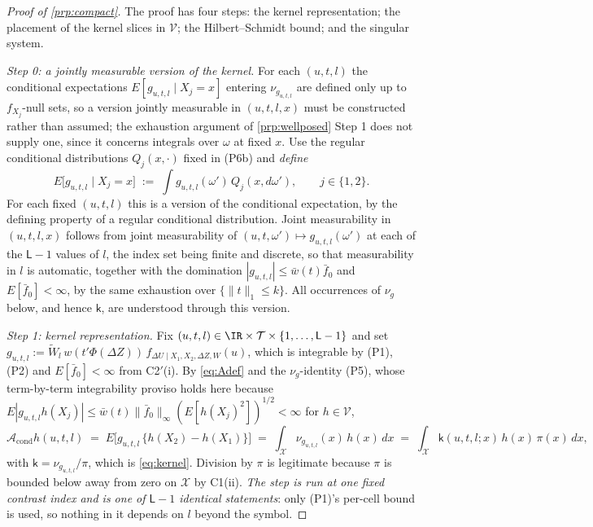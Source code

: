 \begin{proof}[Proof of \cref{prp:compact}]
The proof has four steps: the kernel representation; the placement of the kernel slices in $\mathcal V$;
the Hilbert--Schmidt bound; and the singular system.

\emph{Step 0: a jointly measurable version of the kernel.}
For each $(u,t,l)$ the conditional expectations $E[g_{u,t,l}\mid X_j=x]$ entering $\nu_{g_{u,t,l}}$ are
defined only up to $f_{X_j}$-null sets, so a version jointly measurable in $(u,t,l,x)$ must be
constructed rather
than assumed; the exhaustion argument of \cref{prp:wellposed} Step 1 does not supply one, since it
concerns integrals over $\omega$ at fixed $x$. Use the regular conditional distributions $Q_j(x,\cdot)$
fixed in (P6b) and \emph{define}
\[
E\big[g_{u,t,l}\mid X_j=x\big]\;:=\;\int g_{u,t,l}(\omega')\,Q_j(x,d\omega'),
\qquad j\in\{1,2\}.
\]
For each fixed $(u,t,l)$ this is a version of the conditional expectation, by the defining property of a
regular conditional distribution. Joint measurability in $(u,t,l,x)$ follows from joint measurability of
$(u,t,\omega')\mapsto g_{u,t,l}(\omega')$ at each of the $\mathsf L-1$ values of $l$, the index set
being finite and discrete, so that measurability in $l$ is automatic, together with the domination
$|g_{u,t,l}|\le\bar w(t)\bar f_0$ and
$E[\bar f_0]<\infty$, by the same exhaustion over $\{\|t\|_1\le k\}$. All occurrences of $\nu_g$ below,
and hence $\mathsf k$, are understood through this version.

\emph{Step 1: kernel representation.}
Fix $(u,t,l)\in\IR\times\mathcal T\times\{1,\dots,\mathsf L-1\}$ and set
$g_{u,t,l}:=\widetilde W_l\,w(t'\Phi(\Delta Z))\,f_{\Delta U\mid X_1,X_2,\Delta Z,W}(u)$,
which is integrable by (P1), (P2) and $E[\bar f_0]<\infty$ from C2$'$(i). By \eqref{eq:Adef} and the
$\nu_g$-identity (P5), whose term-by-term integrability proviso holds here because
$E|g_{u,t,l}h(X_j)|\le\bar w(t)\|\bar f_0\|_\infty(E[h(X_j)^{2}])^{1/2}<\infty$ for $h\in\mathcal V$,
\[
\mathcal A_{\mathrm{cond}}h(u,t,l)\;=\;E\big[g_{u,t,l}\,\{h(X_2)-h(X_1)\}\big]
\;=\;\int_{\mathcal X}\nu_{g_{u,t,l}}(x)\,h(x)\,dx
\;=\;\int_{\mathcal X}\mathsf k(u,t,l;x)\,h(x)\,\pi(x)\,dx,
\]
with $\mathsf k=\nu_{g_{u,t,l}}/\pi$, which is \eqref{eq:kernel}. Division by $\pi$ is legitimate because
$\pi$ is bounded below away from zero on $\mathcal X$ by C1(ii). \emph{The step is run at one fixed
contrast index and is one of $\mathsf L-1$ identical statements}: only (P1)'s per-cell bound is used, so
nothing in it depends on $l$ beyond the symbol.


\end{proof}
